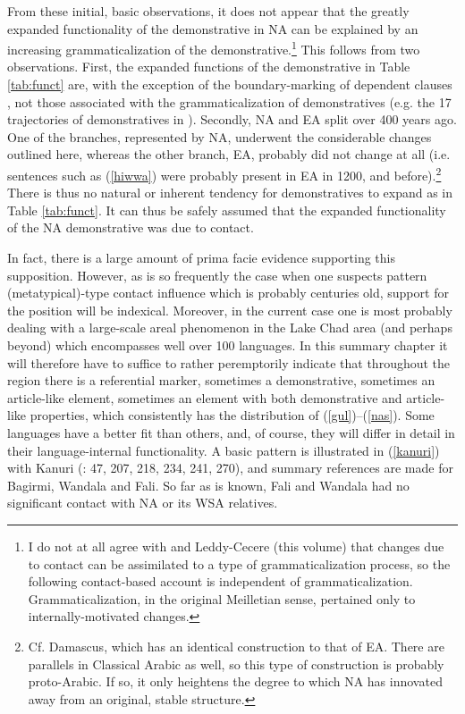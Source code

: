 \documentclass[output=paper]{langsci/langscibook}
\begin{document}
From these initial, basic observations, it does not appear that the greatly expanded functionality of the demonstrative in NA can be explained by an increasing grammaticalization of the demonstrative.\footnote{I do not at all agree with \citet{HeineKuteva2011} and Leddy-Cecere (this volume) that changes due to contact can be assimilated to a type of grammaticalization process, so the following contact-based account is independent of grammaticalization. Grammaticalization, in the original Meilletian sense, pertained only to internally-motivated changes.} This follows from two observations. First, the expanded functions of the demonstrative in Table \ref{tab:funct} are, with the exception of the boundary-marking of dependent clauses , not those associated with the grammaticalization of demonstratives (e.g. the 17 trajectories of demonstratives in \citealt{Diessel1999}). Secondly, NA and EA split over 400 years ago. One of the branches, represented by NA, underwent the considerable changes outlined here, whereas the other branch, EA, probably did not change at all (i.e. sentences such as (\ref{hiwwa}) were probably present in EA in 1200, and before).\footnote{Cf. Damascus, which has an identical construction to that of EA. There are parallels in Classical Arabic as well, so this type of construction is probably proto-Arabic. If so, it only heightens the degree to which NA has innovated away from an original, stable structure.} There is thus no natural or inherent tendency for demonstratives to expand as in Table \ref{tab:funct}. It can thus be safely assumed that the expanded functionality of the NA demonstrative was due to contact.

In fact, there is a large amount of prima facie evidence supporting this supposition. However, as is so frequently the case when one suspects pattern (metatypical)-type contact influence which is probably centuries old, support for the position will be indexical. Moreover, in the current case one is most probably dealing with a large-scale areal phenomenon in the Lake Chad area (and perhaps beyond) which encompasses well over 100 languages. In this summary chapter it will therefore have to suffice to rather peremptorily indicate that throughout the region there is a referential marker, sometimes a demonstrative, sometimes an article-like element, sometimes an element with both demonstrative and article-like properties, which consistently has the distribution of (\ref{gul})–(\ref{nas}). Some languages have a better fit than others, and, of course, they will differ in detail in their language-internal functionality. A basic pattern is illustrated in (\ref{kanuri}) with Kanuri (\citealt{Hutchison1981}: 47, 207, 218, 234, 241, 270), and summary references are made for Bagirmi, Wandala and Fali. So far as is known, Fali and Wandala had no significant contact with NA or its WSA relatives.
\end{document}
